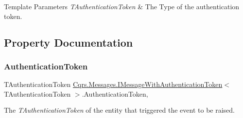 \begin{DoxyTemplParams}{Template Parameters}
{\em T\+Authentication\+Token} & The Type of the authentication token.\\
\hline
\end{DoxyTemplParams}


\subsection{Property Documentation}
\mbox{\label{interfaceCqrs_1_1Messages_1_1IMessageWithAuthenticationToken_ac80645a12251d6d8766b0ee18e0386f1_ac80645a12251d6d8766b0ee18e0386f1}} 
\subsubsection{\texorpdfstring{Authentication\+Token}{AuthenticationToken}}
{\footnotesize\ttfamily T\+Authentication\+Token \hyperlink{interfaceCqrs_1_1Messages_1_1IMessageWithAuthenticationToken}{Cqrs.\+Messages.\+I\+Message\+With\+Authentication\+Token}$<$ T\+Authentication\+Token $>$.Authentication\+Token\hspace{0.3cm}{\ttfamily [get]}, {\ttfamily [set]}}



The {\itshape T\+Authentication\+Token}  of the entity that triggered the event to be raised. 

